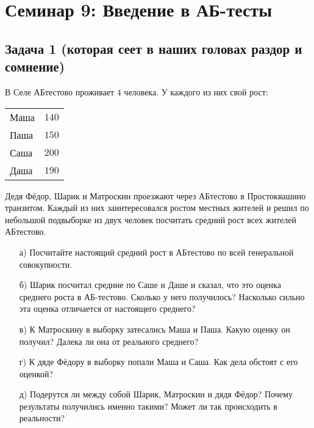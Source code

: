 \documentclass[12pt, a4paper, oneside]{article}
\begin{document}
\section*{Семинар 9: Введение в АБ-тесты }

\subsection*{Задача 1 (которая сеет в наших головах раздор и сомнение)}

В Селе  АБтестово проживает $4$ человека. У каждого из них свой рост:

\begin{center}
	\begin{tabular}{lc}
		\toprule
		Маша & $140$  \\
		Паша &  $150$\\
		Саша &  $200$\\
		Даша &  $190$\\ 
		\bottomrule
	\end{tabular}	
\end{center}

Дедя Фёдор, Шарик и Матроскин проезжают через АБтестово в Простоквашино транзитом. Каждый из них заинтересовался ростом местных жителей и решил по небольшой подвыборке из двух человек посчитать средний рост всех жителей АБтестово. 

\begin{enumerate} 
	\item[а)] Посчитайте настоящий средний рост в АБтестово по всей генеральной совокупности.
	\item[б)] Шарик посчитал средние по Саше и Даше и сказал, что это оценка среднего роста в АБ-тестово. Сколько у него получилось? Насколько сильно эта оценка отличается от настоящего среднего? 
	\item[в)] К Матроскину в выборку затесались Маша и Паша. Какую оценку он получил? Далека ли она от реального среднего? 
	\item[г)] К дяде Фёдору в выборку попали Маша и Саша. Как дела обстоят с его оценкой? 
	\item[д)] Подерутся ли между собой Шарик, Матроскин и дядя Фёдор? Почему результаты получились именно такими? Может ли так происходить в реальности? 
\end{enumerate} 
\end{document}
